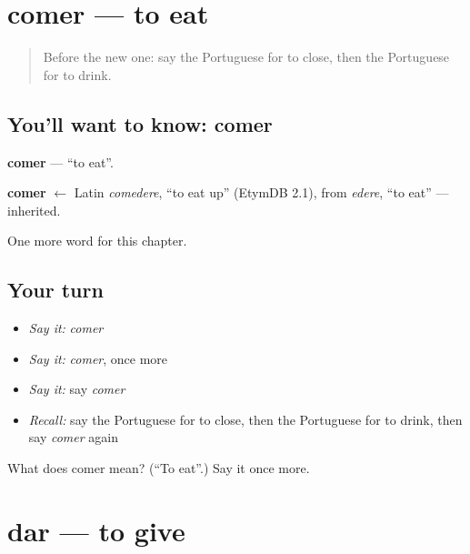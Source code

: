 \section[comer]{comer — to eat}

\label{lesson:PT-C43-comer}



\begin{quote}
Before the new one: say the Portuguese for to close, then the Portuguese for to drink.
\end{quote}

\subsection*{You'll want to know: comer}
\textbf{comer} — \textquotedblleft{}to eat\textquotedblright{}.

\begin{cousinweb}
\textbf{comer} $\leftarrow$ Latin \emph{comedere}, \textquotedblleft{}to eat up\textquotedblright{} (EtymDB 2.1), from \emph{edere}, \textquotedblleft{}to eat\textquotedblright{} — inherited.
\end{cousinweb}

\begin{grammarlens}[title={What you've built}]
One more word for this chapter.
\end{grammarlens}

\subsection*{Your turn}
\begin{itemize}
\raggedright
  \item \emph{Say it:} \emph{comer}
  \item \emph{Say it:} \emph{comer}, once more
  \item \emph{Say it:} say \emph{comer}
  \item \emph{Recall:} say the Portuguese for to close, then the Portuguese for to drink, then say \emph{comer} again
\end{itemize}

\begin{tcolorbox}[breakable,colback=teal!4,colframe=teal!35!black,title={Before you move on}]
What does comer mean? (\textquotedblleft{}To eat\textquotedblright{}.) Say it once more.
\end{tcolorbox}
\section[dar]{dar — to give}

